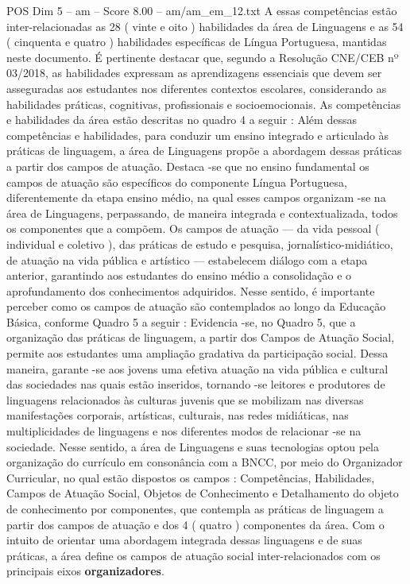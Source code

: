 \begin{textsample}{POS Dim 5 – am – Score 8.00 – am/am\_em\_12.txt}
A essas competências estão inter-relacionadas as 28 ( vinte e oito ) habilidades da área de Linguagens e as 54 ( cinquenta e quatro ) habilidades específicas de Língua Portuguesa, mantidas neste documento.
É pertinente destacar que, segundo a Resolução CNE/CEB nº 03/2018, as habilidades expressam as aprendizagens essenciais que devem ser asseguradas aos estudantes nos diferentes contextos escolares, considerando as habilidades práticas, cognitivas, profissionais e socioemocionais.
As competências e habilidades da área estão descritas no quadro 4 a seguir : Além dessas competências e habilidades, para conduzir um ensino integrado e articulado às práticas de linguagem, a área de Linguagens propõe a abordagem dessas práticas a partir dos campos de atuação.
Destaca -se que no ensino fundamental os campos de atuação são específicos do componente Língua Portuguesa, diferentemente da etapa ensino médio, na qual esses campos organizam -se na área de Linguagens, perpassando, de maneira integrada e contextualizada, todos os componentes que a compõem.
Os campos de atuação — da vida pessoal ( individual e coletivo ), das práticas de estudo e pesquisa, jornalístico-midiático, de atuação na vida pública e artístico — estabelecem diálogo com a etapa anterior, garantindo aos estudantes do ensino médio a consolidação e o aprofundamento dos conhecimentos adquiridos.
Nesse sentido, é importante perceber como os campos de atuação são contemplados ao longo da Educação Básica, conforme Quadro 5 a seguir : Evidencia -se, no Quadro 5, que a organização das práticas de linguagem, a partir dos Campos de Atuação Social, permite aos estudantes uma ampliação gradativa da participação social.
Dessa maneira, garante -se aos jovens uma efetiva atuação na vida pública e cultural das sociedades nas quais estão inseridos, tornando -se leitores e produtores de linguagens relacionados às culturas juvenis que se mobilizam nas diversas manifestações corporais, artísticas, culturais, nas redes midiáticas, nas multiplicidades de linguagens e nos diferentes modos de relacionar -se na sociedade.
Nesse sentido, a área de Linguagens e suas tecnologias optou pela organização do currículo em consonância com a BNCC, por meio do Organizador Curricular, no qual estão dispostos os campos : Competências, Habilidades, Campos de Atuação Social, Objetos de Conhecimento e Detalhamento do objeto de conhecimento por componentes, que contempla as práticas de linguagem a partir dos campos de atuação e dos 4 ( quatro ) componentes da área.
Com o intuito de orientar uma abordagem integrada dessas linguagens e de suas práticas, a área define os campos de atuação social inter-relacionados com os principais eixos \textbf{organizadores}.

\end{textsample}

